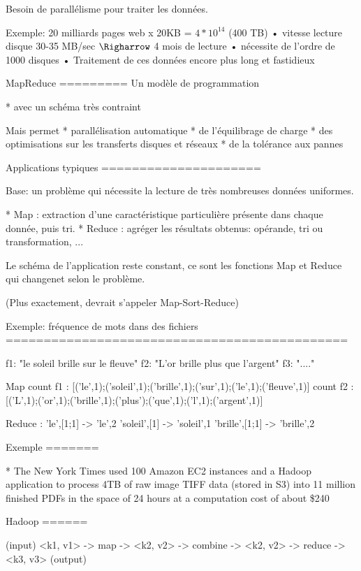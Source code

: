 

Besoin de parallélisme pour traiter les données.


Exemple: 20 milliards pages web x 20KB = $4* 10^{14}$ (400 TB)
• vitesse lecture disque 30-35 MB/sec
$\Righarrow$ 4 mois de lecture
• nécessite de l'ordre de 1000 disques
• Traitement de ces données encore plus long et fastidieux


MapReduce
=========
Un modèle de programmation

* avec un schéma très contraint

Mais permet
* parallélisation automatique
* de l'équilibrage de charge
* des optimisations sur les transferts disques et réseaux
* de la tolérance aux pannes


Applications typiques
=====================


Base: un problème qui nécessite la lecture de très 
nombreuses données uniformes.

* Map : extraction d'une caractéristique particulière présente dans chaque donnée,
puis tri.
* Reduce : agréger les résultats obtenus: opérande, tri ou transformation, ...

Le schéma de l'application reste constant, ce sont les 
fonctions Map et Reduce qui changenet selon le problème.

(Plus exactement, devrait s'appeler Map-Sort-Reduce)


Exemple: fréquence de mots dans des fichiers
=============================================

f1: "le soleil brille sur le fleuve"
f2: "L'or brille plus que l'argent"
f3: "...."

Map count f1 : [('le',1);('soleil',1);('brille',1);('sur',1);('le',1);('fleuve',1)]
    count f2 : [('L',1);('or',1);('brille',1);('plus');('que',1);('l',1);('argent',1)]

Reduce :
     'le',[1;1]     ->  'le',2
     'soleil',[1]   ->  'soleil',1
     'brille',[1;1]   ->  'brille',2


Exemple
=======

* The New York Times used 100 Amazon EC2 instances and a Hadoop application to process 4TB of raw image TIFF data (stored in S3) into 11 million finished PDFs in the space of 24 hours at a computation cost of about  
\$240 



Hadoop
======

(input) <k1, v1> -> map -> <k2, v2> -> combine -> <k2, v2> -> reduce -> <k3, v3> (output) 







